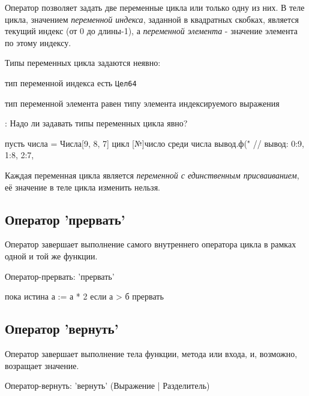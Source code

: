Оператор позволяет задать две переменные цикла или только одну из них. 
В теле цикла, значением \emph{переменной индекса}, заданной в квадратных скобках, является текущий индекс (от 0 до длины-1), 
а \emph{переменной элемента} - значение элемента по этому индексу.

Типы переменных цикла задаются неявно:
\begin{d_itemize}
\item
    тип переменной индекса есть \verb+Цел64+
\item
    тип переменной элемента равен типу элемента индексируемого выражения
\end{d_itemize}

\TBD: Надо ли задавать типы переменных цикла явно?

\begin{Trivil}
пусть числа = Числа[9, 8, 7]
цикл [№]число среди числа {
    вывод.ф("%
}
// вывод: 0:9, 1:8, 2:7,
\end{Trivil}

Каждая переменная цикла является \emph{переменной с единственным присваиванием}, 
её значение в теле цикла изменить нельзя.

\hypertarget{break-stmt}{%
\subsection{Оператор 'прервать'}\label{stmt:break-stmt}}

Оператор  завершает выполнение самого внутреннего оператора цикла в рамках одной и той же функции.

\begin{Grammar}
Оператор-прервать: 'прервать' 
\end{Grammar}

\begin{Trivil}
пока истина {
    а := а * 2
    если а > б { прервать }
}
\end{Trivil}

\hypertarget{return-stmt}{%
\subsection{Оператор 'вернуть'}\label{stmt:return-stmt}}

Оператор  завершает выполнение тела функции, метода или входа, и, возможно, возращает значение.

\begin{Grammar}
Оператор-вернуть: 'вернуть' (Выражение | Разделитель)
\end{Grammar}

